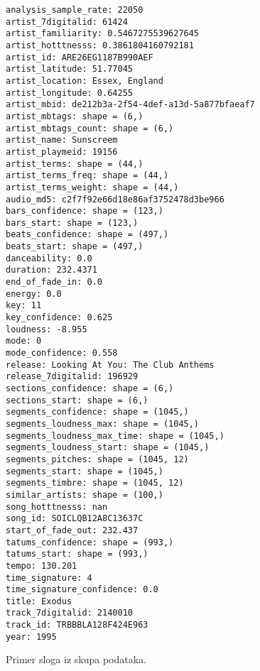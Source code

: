 \begin{figure}[ht]
\begin{verbatim}
analysis_sample_rate: 22050
artist_7digitalid: 61424
artist_familiarity: 0.5467275539627645
artist_hotttnesss: 0.3861804160792181
artist_id: ARE26EG1187B990AEF
artist_latitude: 51.77045
artist_location: Essex, England
artist_longitude: 0.64255
artist_mbid: de212b3a-2f54-4def-a13d-5a877bfaeaf7
artist_mbtags: shape = (6,)
artist_mbtags_count: shape = (6,)
artist_name: Sunscreem
artist_playmeid: 19156
artist_terms: shape = (44,)
artist_terms_freq: shape = (44,)
artist_terms_weight: shape = (44,)
audio_md5: c2f7f92e66d18e86af3752478d3be966
bars_confidence: shape = (123,)
bars_start: shape = (123,)
beats_confidence: shape = (497,)
beats_start: shape = (497,)
danceability: 0.0
duration: 232.4371
end_of_fade_in: 0.0
energy: 0.0
key: 11
key_confidence: 0.625
loudness: -8.955
mode: 0
mode_confidence: 0.558
release: Looking At You: The Club Anthems
release_7digitalid: 196929
sections_confidence: shape = (6,)
sections_start: shape = (6,)
segments_confidence: shape = (1045,)
segments_loudness_max: shape = (1045,)
segments_loudness_max_time: shape = (1045,)
segments_loudness_start: shape = (1045,)
segments_pitches: shape = (1045, 12)
segments_start: shape = (1045,)
segments_timbre: shape = (1045, 12)
similar_artists: shape = (100,)
song_hotttnesss: nan
song_id: SOICLQB12A8C13637C
start_of_fade_out: 232.437
tatums_confidence: shape = (993,)
tatums_start: shape = (993,)
tempo: 130.201
time_signature: 4
time_signature_confidence: 0.0
title: Exodus
track_7digitalid: 2140010
track_id: TRBBBLA128F424E963
year: 1995

\end{verbatim}
\label{primer:Song}
\caption{Primer sloga iz skupa podataka.}
\end{figure}
